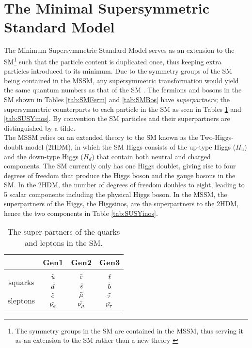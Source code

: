 \section{The Minimal Supersymmetric Standard Model}
The Minimum Supersymmetric Standard Model serves as an extension to the SM\footnote{The symmetry groups in the SM are contained in the MSSM, thus serving it as an extension to the SM rather than a new theory \cite{baer2006weak}} such that the particle content is duplicated once, thus keeping extra particles introduced to its minimum.  Due to the symmetry groups of the SM being contained in the MSSM, any supersymmetric transformation would yield the same quantum numbers as that of the SM \cite{aitchison2007supersymmetry}. The fermions and bosons in the SM shown in Tables \ref{tab:SMFerm} and \ref{tab:SMBos}  have \textit{superpartners}; the supersymmetric counterparts to each particle in the SM as seen in Tables \ref{tab:SUSYspart} and \ref{tab:SUSYinos}. By convention the SM particles and their superpartners are distinguished by a tilde. \\

The MSSM relies on an extended theory to the SM known as the Two-Higgs-doublt model (2HDM), in which the SM Higgs consists of the up-type Higgs ($H_u$) and the down-type Higgs ($H_d$) that contain both neutral and charged components. The SM currently only has one Higgs doublet, giving rise to four degrees of freedom that produce the Higgs boson and the gauge bosons in the SM. In the 2HDM, the number of degrees of freedom doubles to eight, leading to 5 scalar components including the physical Higgs boson. In the MSSM, the superpartners of the Higgs, the Higgsinos, are the superpartners to the 2HDM, hence the two components in Table \ref{tab:SUSYinos}.

\begin{table}[htbp]
    \centering
    \begin{tabular}{||c|c|c|c||}
    \hline
    & Gen1 & Gen2 & Gen3 \\
    \hline
    & \\[-2.7ex]
    \multirow{2}{1.4cm}{squarks} & $\Tilde{u}$ & $\Tilde{c}$ & \small$\Tilde{t}$ \\
     & $\Tilde{d}$ & $\Tilde{s}$ & $\Tilde{b}$ \\
    \hline
    
    \multirow{2}{1.4cm}{sleptons} & $\Tilde{e}$ & $\Tilde{\mu}$ & $\Tilde{\tau}$ \\
     & $\Tilde{\nu_e}$ & $\Tilde{\nu_\mu}$ & $\Tilde{\nu_\tau}$ \\
    \hline
    \end{tabular}
    \caption{The super-partners of the quarks and leptons in the SM.}
    \label{tab:SUSYspart}
\end{table}

